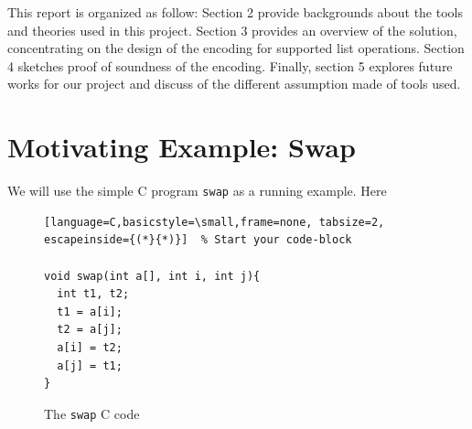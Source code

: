\documentclass[onecolumn, preprint]{sigplanconf}
\begin{document}
This report is organized as follow: Section 2 provide backgrounds about the tools and theories used in this project. Section 3 provides an overview of the solution, concentrating on the design of the encoding for supported list operations. Section 4 sketches proof of soundness of the encoding. Finally, section 5 explores future works for our project and discuss of the different assumption made of tools used.

\section{Motivating Example: Swap}
\label{sec:motiv}

We will use the simple C program \texttt{swap} as a running example. Here 

\begin{figure}
\begin{lstlisting}[language=C,basicstyle=\small,frame=none, tabsize=2, escapeinside={(*}{*)}]  % Start your code-block

void swap(int a[], int i, int j){
  int t1, t2;
  t1 = a[i];
  t2 = a[j];
  a[i] = t2;
  a[j] = t1;
}
\end{lstlisting}
   \label{fig:swap}
   \caption{The \texttt{swap}  C code}
\end{figure}
\end{document}
